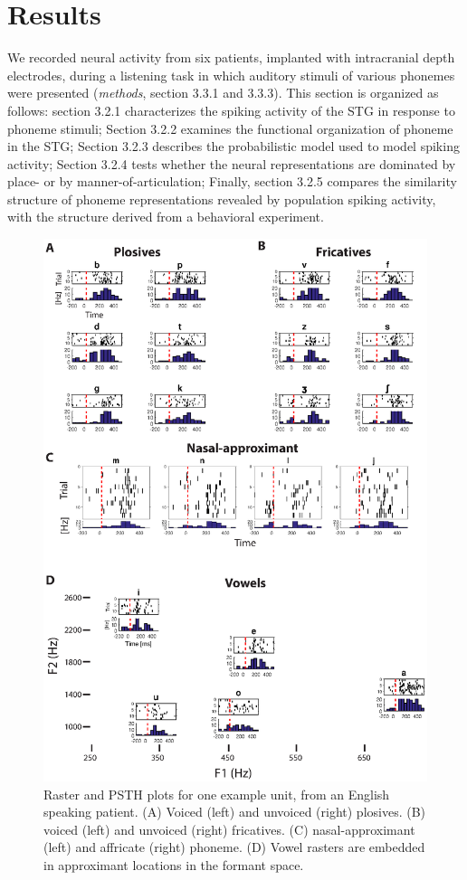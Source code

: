 \section{Results}
We recorded neural activity from six patients, implanted with intracranial depth electrodes, during a listening task in which auditory stimuli of various phonemes were presented (\textit{methods}, section 3.3.1 and 3.3.3). This section is organized as follows: section 3.2.1 characterizes the spiking activity of the STG in response to phoneme stimuli; Section 3.2.2 examines the functional organization of phoneme in the STG; Section 3.2.3 describes the probabilistic model used to model spiking activity; Section 3.2.4 tests whether the neural representations are dominated by place- or by manner-of-articulation; Finally, section 3.2.5 compares the similarity structure of phoneme representations revealed by population spiking activity, with the structure derived from a behavioral experiment.

\begin{figure}[H]
\vspace{.3in}
\includegraphics[width=\linewidth]{Figures/Ch3/Figure2_new.eps}
\caption{Raster and PSTH plots for one example unit, from an English speaking patient. (A) Voiced (left) and unvoiced (right) plosives. (B) voiced (left) and unvoiced (right) fricatives. (C)  nasal-approximant (left) and affricate (right) phoneme. (D) Vowel rasters are embedded in approximant locations in the formant space.}
\end{figure}

